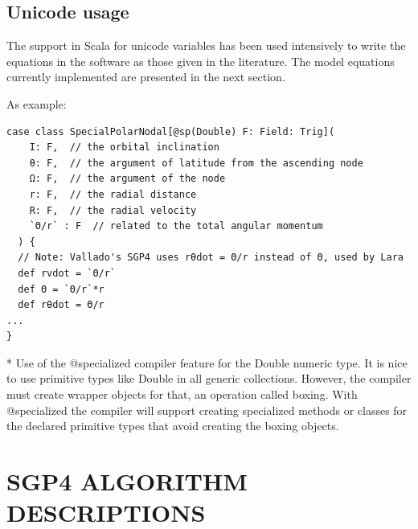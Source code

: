 \documentclass{article}
\begin{document}
\subsection{Unicode usage}
\label{sec:unicodeusage}

The support in Scala for unicode variables has been used intensively to write
the equations in the software as those given in the literature. The
model equations currently implemented are presented in the next section.

As example:
\begin{lstlisting}[style=myScalastyle]
case class SpecialPolarNodal[@sp(Double) F: Field: Trig](
    I: F,  // the orbital inclination
    θ: F,  // the argument of latitude from the ascending node
    Ω: F,  // the argument of the node
    r: F,  // the radial distance
    R: F,  // the radial velocity
    `Θ/r` : F  // related to the total angular momentum
  ) {
  // Note: Vallado's SGP4 uses rθdot = Θ/r instead of Θ, used by Lara
  def rvdot = `Θ/r`
  def Θ = `Θ/r`*r
  def rθdot = Θ/r
...
}
\end{lstlisting}

* Use of the @specialized compiler feature for the Double numeric type. It is nice
to use primitive types like Double in all generic collections. However, the compiler
must create wrapper objects for that, an operation called boxing. With @specialized
the compiler will support creating specialized methods or classes for the
declared primitive types that avoid creating the boxing objects.




\section{SGP4 ALGORITHM DESCRIPTIONS}
\label{sec:algorithms}


\end{document}
